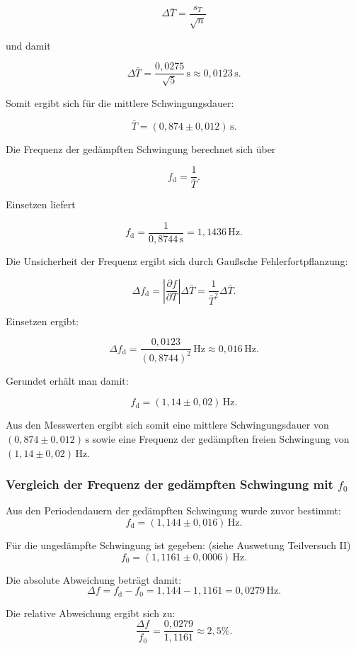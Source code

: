 \documentclass{report}
\begin{document}
\[
\Delta \bar{T} = \frac{s_T}{\sqrt{n}}
\]

und damit

\[
\Delta \bar{T} = \frac{0{,}0275}{\sqrt{5}}\,\mathrm{s} \approx 0{,}0123\,\mathrm{s}.
\]

Somit ergibt sich für die mittlere Schwingungsdauer:

\[
\boxed{\bar{T} = (0{,}874 \pm 0{,}012)\,\mathrm{s}}.
\]

Die Frequenz der gedämpften Schwingung berechnet sich über

\[
f_\mathrm{d} = \frac{1}{\bar{T}}.
\]

Einsetzen liefert

\[
f_\mathrm{d} = \frac{1}{0{,}8744\,\mathrm{s}} = 1{,}1436\,\mathrm{Hz}.
\]

Die Unsicherheit der Frequenz ergibt sich durch Gaußsche Fehlerfortpflanzung:

\[
\Delta f_\mathrm{d}
=
\left|\frac{\partial f}{\partial T}\right| \Delta \bar{T}
=
\frac{1}{\bar{T}^2}\Delta \bar{T}.
\]

Einsetzen ergibt:

\[
\Delta f_\mathrm{d}
=
\frac{0{,}0123}{(0{,}8744)^2}\,\mathrm{Hz}
\approx 0{,}016\,\mathrm{Hz}.
\]

Gerundet erhält man damit:

\[
\boxed{f_\mathrm{d} = (1{,}14 \pm 0{,}02)\,\mathrm{Hz}}.
\]

\noindent
Aus den Messwerten ergibt sich somit eine mittlere Schwingungsdauer 
von $(0{,}874 \pm 0{,}012)\,\mathrm{s}$ sowie eine Frequenz der gedämpften 
freien Schwingung von $(1{,}14 \pm 0{,}02)\,\mathrm{Hz}$. 


\subsubsection*{Vergleich der Frequenz der gedämpften Schwingung mit $f_0$}

Aus den Periodendauern der gedämpften Schwingung wurde zuvor bestimmt:
\[
f_\mathrm{d} = (1{,}144 \pm 0{,}016)\,\mathrm{Hz}.
\]

Für die ungedämpfte Schwingung ist gegeben: (siehe Auswetung Teilversuch II)
\[
f_0 = (1{,}1161 \pm 0{,}0006)\,\mathrm{Hz}.
\]

Die absolute Abweichung beträgt damit:
\[
\Delta f = f_\mathrm{d} - f_0
= 1{,}144 - 1{,}1161
= 0{,}0279\,\mathrm{Hz}.
\]

Die relative Abweichung ergibt sich zu:
\[
\frac{\Delta f}{f_0}
= \frac{0{,}0279}{1{,}1161}
\approx 2{,}5\%.
\]
\end{document}
